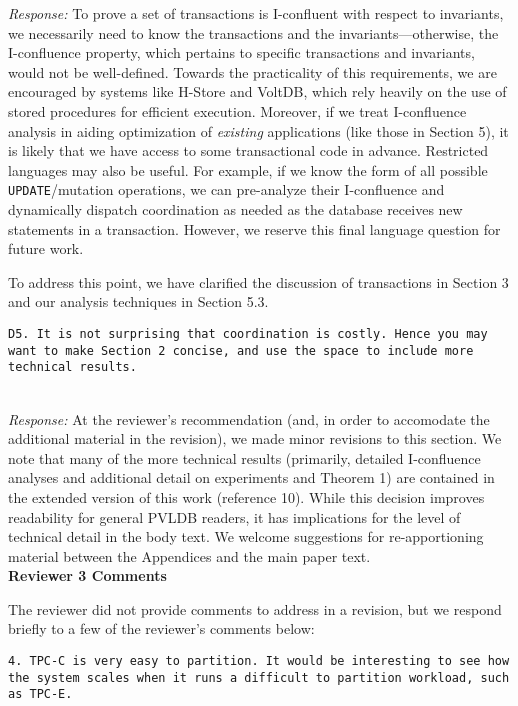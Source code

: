 \documentclass[10pt]{article}
\newcommand{\reviewer}[1] {\noindent\colorbox{reviewercolor}{\parbox{\textwidth}{\noindent\texttt{#1}}}\\}
\newcommand{\response}[1] {\noindent\textit{Response: } #1\\}
\newcommand{\reviewerstart}[1]{\noindent\textbf{\large{#1}}}
\begin{document}
\response{To prove a set of transactions is I-confluent with respect
  to invariants, we necessarily need to know the transactions and the
  invariants---otherwise, the I-confluence property, which pertains to
  specific transactions and invariants, would not be
  well-defined. Towards the practicality of this requirements, we are
  encouraged by systems like H-Store and VoltDB, which rely heavily on
  the use of stored procedures for efficient execution. Moreover, if
  we treat I-confluence analysis in aiding optimization of
  \textit{existing} applications (like those in Section 5), it is
  likely that we have access to some transactional code in
  advance. Restricted languages may also be useful. For example, if we
  know the form of all possible \texttt{UPDATE}/mutation operations,
  we can pre-analyze their I-confluence and dynamically dispatch
  coordination as needed as the database receives new statements in a
  transaction. However, we reserve this final language question for
  future work.

  To address this point, we have clarified the discussion of
  transactions in Section 3 and our analysis techniques in Section
  5.3.}

\reviewer{D5. It is not surprising that coordination is costly. Hence you may want to make Section 2 concise, and use the space to include more technical results. }

\response{At the reviewer's recommendation (and, in order to
  accomodate the additional material in the revision), we made minor
  revisions to this section. We note that many of the more technical
  results (primarily, detailed I-confluence analyses and additional
  detail on experiments and Theorem 1) are contained in the extended
  version of this work (reference 10). While this decision improves
  readability for general PVLDB readers, it has implications for the
  level of technical detail in the body text. We welcome suggestions
  for re-apportioning material between the Appendices and the main
  paper text.}

\newpage
\reviewerstart{Reviewer 3 Comments}\\
\label{r3c}

The reviewer did not provide comments to address in a revision, but we
respond briefly to a few of the reviewer's comments below:

\reviewer{4. TPC-C is very easy to partition. It would be interesting
  to see how the system scales when it runs a difficult to partition
  workload, such as TPC-E. }
\end{document}

